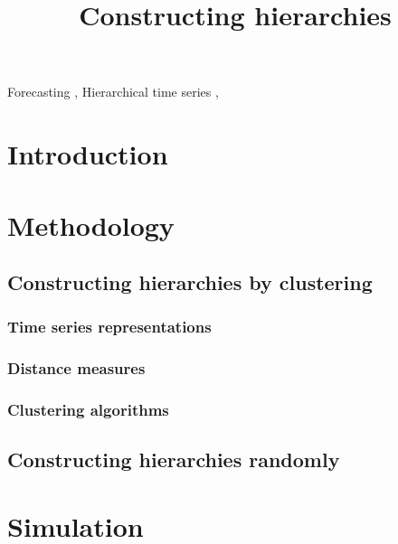 \documentclass[a4paper,review,12pt,authoryear]{elsarticle}
\begin{document}
\begin{frontmatter}

  \title{Constructing hierarchies}


  \begin{abstract}

    

  \end{abstract}

  \begin{keyword}
  Forecasting \sep
  Hierarchical time series \sep
  
  \end{keyword}

\end{frontmatter}

\newpage

\section{Introduction}


\section{Methodology}
\label{sec:method}

\subsection{Constructing hierarchies by clustering}

\subsubsection{Time series representations}

\subsubsection{Distance measures}

\subsubsection{Clustering algorithms}
\label{sec:clustering}

\subsection{Constructing hierarchies randomly}

\section{Simulation}
\label{sec:simulation}
\end{document}

